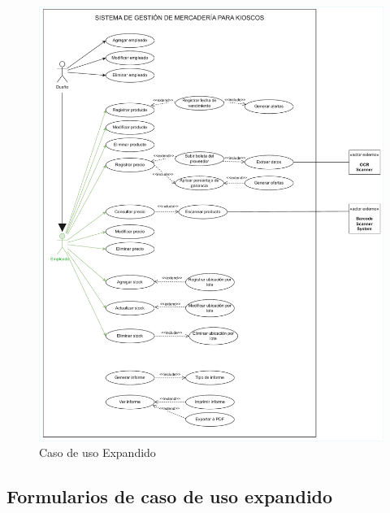 \documentclass[twoside]{article}
\begin{document}
\begin{figure}[!h]
    \centering
    \includegraphics[scale=0.70]{casodeusoexpandido.pdf}
    \caption{Caso de uso Expandido}
    \label{fig:enter-label}
\end{figure}

\newpage
\subsection{Formularios de caso de uso expandido}
\end{document}

